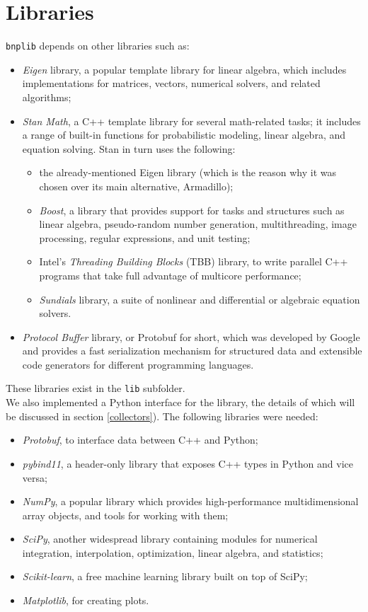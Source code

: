 \section{Libraries}
\verb|bnplib| depends on other libraries such as:
\begin{itemize}
	\item \emph{Eigen} library, a popular template library for linear algebra, which includes implementations for matrices, vectors, numerical solvers, and related algorithms;
	\item \emph{Stan Math}, a C++ template library for several math-related tasks; it includes a range of built-in functions for probabilistic modeling, linear algebra, and equation solving.
	Stan in turn uses the following:
	\begin{itemize}
		\item the already-mentioned Eigen library (which is the reason why it was chosen over its main alternative, Armadillo);
		\item \emph{Boost}, a library that provides support for tasks and structures such as linear algebra, pseudo-random number generation, multithreading, image processing, regular expressions, and unit testing;
		\item Intel's \emph{Threading Building Blocks} (TBB) library, to write parallel C++ programs that take full advantage of multicore performance;
		\item \emph{Sundials} library, a suite of nonlinear and differential or algebraic equation solvers.
	\end{itemize}
	\item \emph{Protocol Buffer} library, or Protobuf for short, which was developed by Google and provides a fast serialization mechanism for structured data and extensible code generators for different programming languages.
\end{itemize}
These libraries exist in the \verb|lib| subfolder. \\
We also implemented a Python interface for the library, the details of which will be discussed in section \ref{collectors}).
The following libraries were needed:
\begin{itemize}
	\item \emph{Protobuf}, to interface data between C++ and Python;
	\item \emph{pybind11}, a header-only library that exposes C++ types in Python and vice versa;
	\item \emph{NumPy}, a popular library which provides high-performance multidimensional array objects, and tools for working with them;
	\item \emph{SciPy}, another widespread library containing modules for numerical integration, interpolation, optimization, linear algebra, and statistics;
	\item \emph{Scikit-learn}, a free machine learning library built on top of SciPy;
	\item \emph{Matplotlib}, for creating plots.
\end{itemize}
